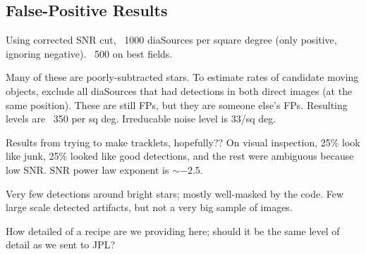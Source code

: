 \subsection{False-Positive Results}

Using corrected SNR cut, ~1000 diaSources per square degree (only positive,
ignoring negative). ~500 on best fields.

Many of these are poorly-subtracted stars. To estimate rates of candidate moving
objects, exclude all diaSources that had detections in both direct images (at
the same position). These are still FPs, but they are someone else's FPs.
Resulting levels are ~350 per sq deg. Irreducable noise level is 33/sq deg.

Results from trying to make tracklets, hopefully?? On visual inspection, 25\%
look like junk, 25\% looked like good detections, and the rest were ambiguous
because low SNR. SNR power law exponent is $\sim -2.5$.

Very few detections around bright stars; mostly well-masked by the code. Few
large scale detected artifacts, but not a very big sample of images.

How detailed of a recipe are we providing here; should it be the same level of
detail as we sent to JPL?
